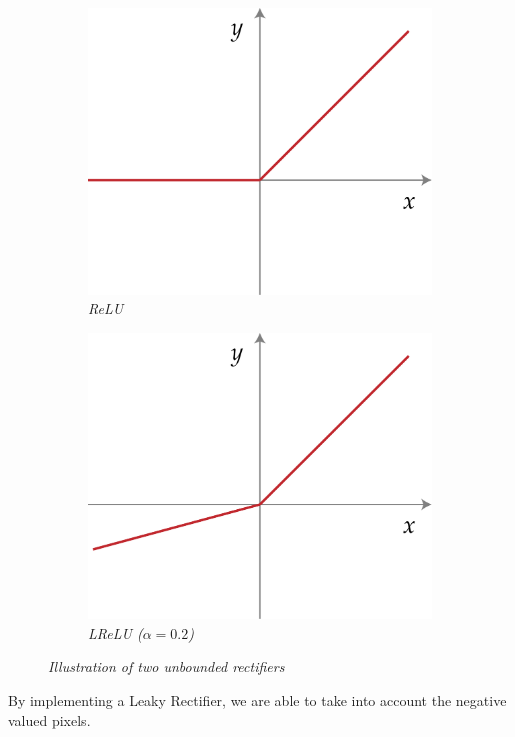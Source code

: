 \documentclass{article}
\begin{document}
            \begin{figure}[!ht]
                \begin{subfigure}{.49\linewidth}
                    \centering
                    \includegraphics[width=.7\linewidth]{pics/act-relu.png}
                    \caption{\textit{ReLU}}
                    \label{fig:relu}
                \end{subfigure}
                \begin{subfigure}{.49\linewidth}
                    \centering
                    \includegraphics[width=.7\linewidth]{pics/act-lrelu.png}
                    \caption{\textit{LReLU ($\alpha=0.2$)}}
                    \label{fig:lrelu}
                \end{subfigure}
                \caption{\textit{Illustration of two unbounded rectifiers}}
            \end{figure}

            \noindent By implementing a Leaky Rectifier, we are able to take into account the negative valued pixels.
\end{document}
